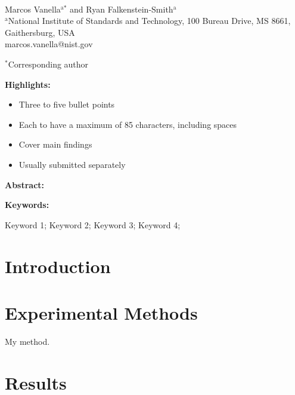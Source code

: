 \documentclass[12pt,letterpaper]{article}
\begin{document}
\begin{flushleft} %

\textbf{}
\vspace{3mm}\\
%
Marcos Vanella$^\text{a*}$ and Ryan Falkenstein-Smith$^\text{a}$
\vspace{3mm}\\	

$^\text{a}$National Institute of Standards and Technology, 100 Bureau Drive, MS 8661, Gaithersburg, USA  \\
marcos.vanella@nist.gov
\vspace{3mm}

$^*$Corresponding author

\textbf{Highlights:}	
\begin{itemize}
	\itemsep-4pt %
	\item Three to five bullet points
	\item Each to have a maximum of 85 characters, including spaces
	\item Cover main findings
	\item Usually submitted separately
\end{itemize}
\vspace{3mm}

\textbf{Abstract:}
\vspace{3mm}


\textbf{Keywords:}

Keyword 1; Keyword 2; Keyword 3; Keyword 4; 

\section{Introduction}

\section{Experimental Methods}

My method.

\section{Results}


\end{flushleft}
\end{document}
